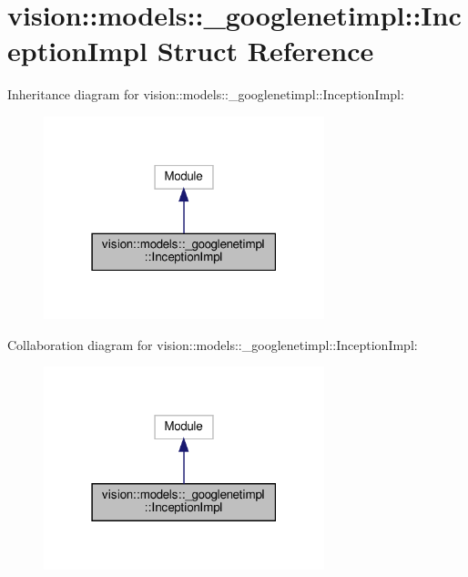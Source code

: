 \hypertarget{structvision_1_1models_1_1__googlenetimpl_1_1InceptionImpl}{}\section{vision\+:\+:models\+:\+:\+\_\+googlenetimpl\+:\+:Inception\+Impl Struct Reference}
\label{structvision_1_1models_1_1__googlenetimpl_1_1InceptionImpl}


Inheritance diagram for vision\+:\+:models\+:\+:\+\_\+googlenetimpl\+:\+:Inception\+Impl\+:
\nopagebreak
\begin{figure}[H]
\begin{center}
\leavevmode
\includegraphics[width=231pt]{structvision_1_1models_1_1__googlenetimpl_1_1InceptionImpl__inherit__graph}
\end{center}
\end{figure}


Collaboration diagram for vision\+:\+:models\+:\+:\+\_\+googlenetimpl\+:\+:Inception\+Impl\+:
\nopagebreak
\begin{figure}[H]
\begin{center}
\leavevmode
\includegraphics[width=231pt]{structvision_1_1models_1_1__googlenetimpl_1_1InceptionImpl__coll__graph}
\end{center}
\end{figure}
